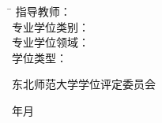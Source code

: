 %
\vspace{-2.4mm}
\vspace{1ex}
\vspace{1ex}
%
\centerline{ \heiti\nsauthornamec}
%
\vspace{1mm}
\begin{tabbing}
    \hspace{40mm}
              \=  \hspace{2em}指导教师：\hspace{1mm} \textbf{\heiti\nsmentorc \quad \nsmentortitle} \\[-0.74mm]
              \>  专业学位类别：\hspace{1mm} \textbf{\heiti\nsmajorc} \\[-0.74mm]
              \>  专业学位领域：\hspace{1mm} \textbf{\heiti\nsrange} \\[-0.74mm]
              \>  \hspace{2em}学位类型：\hspace{1mm} \textbf{\heiti\nstype }\\[-0.74mm]
\end{tabbing}
%
\vspace{21mm}
%
\centerline{\heiti 东北师范大学学位评定委员会}
\vspace{5mm}
\centerline{\heiti \nsdateyear {} \heiti  年\heiti \nsdatemonth{}\heiti 月}
%
